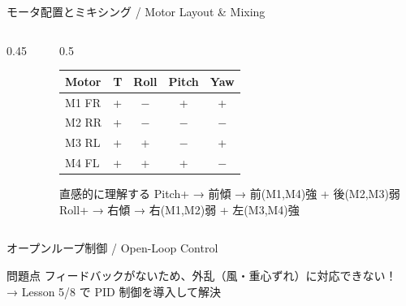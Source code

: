 \begin{frame}{モータ配置とミキシング / Motor Layout \& Mixing}
  \begin{columns}[T]
    \begin{column}{0.45\textwidth}
      \centering
      \resizebox{0.95\columnwidth}{!}{}
    \end{column}
    \begin{column}{0.5\textwidth}
      \begin{table}
        \centering\footnotesize
        \begin{tabular}{lcccc}
          \hline
          \textbf{Motor} & \textbf{T} & \textbf{Roll} & \textbf{Pitch} & \textbf{Yaw} \\
          \hline
          M1 FR & + & $-$ & + & + \\
          M2 RR & + & $-$ & $-$ & $-$ \\
          M3 RL & + & + & $-$ & + \\
          M4 FL & + & + & + & $-$ \\
          \hline
        \end{tabular}
      \end{table}

      \vspace{0.5em}

      \begin{exampleblock}{\footnotesize 直感的に理解する}
        \scriptsize
        Pitch+ → 前傾 → 前(M1,M4)強 + 後(M2,M3)弱\\
        Roll+ → 右傾 → 右(M1,M2)弱 + 左(M3,M4)強
      \end{exampleblock}
    \end{column}
  \end{columns}
\end{frame}

\begin{frame}{オープンループ制御 / Open-Loop Control}
  \begin{center}
    \resizebox{0.75\textwidth}{!}{}
  \end{center}

  \vspace{0.5em}

  \begin{alertblock}{問題点}
    フィードバックがないため、外乱（風・重心ずれ）に対応できない！\\
    → Lesson 5/8 で PID 制御を導入して解決
  \end{alertblock}
\end{frame}


